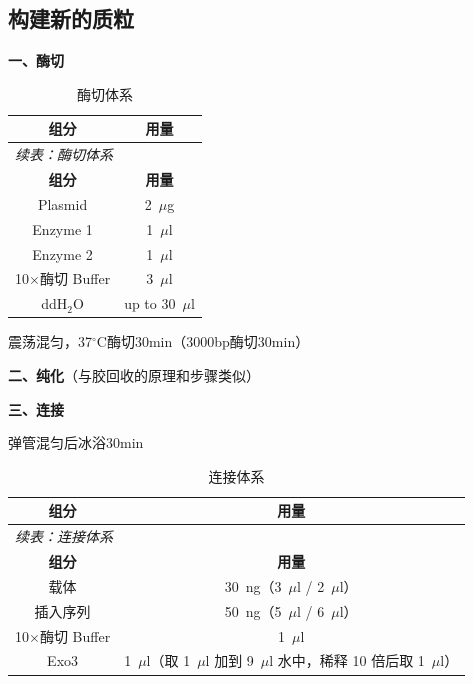 \subsection{构建新的质粒}

\textbf{一、酶切}

\begin{longtable}{cc}
  \caption{酶切体系} \\
  \toprule
  \textbf{组分} & \textbf{用量} \\
  \midrule
  \endfirsthead

  \multicolumn{2}{l}{\textit{续表：酶切体系}} \\
  \toprule
  \textbf{组分} & \textbf{用量} \\
  \midrule
  \endhead

  \bottomrule
  \endfoot

  \bottomrule
  \endlastfoot

  Plasmid & 2~$\mu$g \\
  Enzyme 1 & 1~$\mu$l \\
  Enzyme 2 & 1~$\mu$l \\
  10$\times$酶切 Buffer & 3~$\mu$l \\
  ddH$_2$O & up to 30~$\mu$l \\
  
\end{longtable}

震荡混匀，37$^\circ\text{C}$酶切30min（3000bp酶切30min）

\textbf{二、纯化}（与胶回收的原理和步骤类似）

\textbf{三、连接}

弹管混匀后冰浴30min

\begin{longtable}{cc}
  \caption{连接体系} \\
  \toprule
  \textbf{组分} & \textbf{用量} \\
  \midrule
  \endfirsthead

  \multicolumn{2}{l}{\textit{续表：连接体系}} \\
  \toprule
  \textbf{组分} & \textbf{用量} \\
  \midrule
  \endhead

  \bottomrule
  \endfoot

  \bottomrule
  \endlastfoot

  载体 & 30~ng（3~$\mu$l / 2~$\mu$l） \\
  插入序列 & 50~ng（5~$\mu$l / 6~$\mu$l） \\
  10$\times$酶切 Buffer & 1~$\mu$l \\
  Exo3 & 1~$\mu$l（取 1~$\mu$l 加到 9~$\mu$l 水中，稀释 10 倍后取 1~$\mu$l） \\
\end{longtable}

